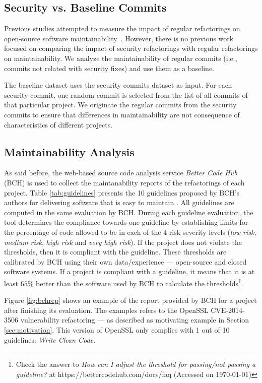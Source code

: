 \documentclass[10pt,conference]{IEEEtran}
\begin{document}
%
\subsection{Security vs. Baseline Commits}
%
Previous studies attempted to measure the impact of regular refactorings on
open-source software maintainability~\cite{HEGEDUS2018313}. However, 
there is no previous work focused on comparing the impact of security 
refactorings with regular refactorings on maintainability. 
We analyze the maintainability of regular commits
(i.e., commits not related with security fixes) and use them as a baseline.

The baseline dataset uses the security commits dataset as input. For each
security commit, one random commit is selected from the list of all commits of
that particular project. We originate the regular commits from the security
commits to ensure that differences in maintainability are not consequence of
characteristics of different projects.
%
\subsection{Maintainability Analysis}

As said before, the web-based source code analysis service \emph{Better Code
Hub} (BCH) is used to collect the maintanability reports of the refactorings of
each project. Table \ref{tab:guidelines} presents the 10 guidelines
proposed by BCH's authors for delivering software that is easy to maintain
\cite{Visser:2016:OREILLY}. All guidelines are computed in the same evaluation by 
BCH. During each guideline evaluation, the tool determines the compliance towards 
one guideline by establishing limits for the percentage of code allowed to be in 
each of the $4$ risk severity levels (\emph{low risk}, \emph{medium risk}, \emph{high risk} 
and \emph{very high risk}). If the project does not violate the thresholds, then it
is compliant with the guideline. These thresholds are calibrated by BCH using
their own data/experience --- open-source and closed software systems. If a
project is compliant with a guideline, it means that it is at least $65\%$
better than the software used by BCH to calculate the thresholds\footnote{Check
the answer to \emph{How can I adjust the threshold for passing/not passing a
guideline?} at https://bettercodehub.com/docs/faq (Accessed on \today{})}.

Figure \ref{fig:bchrep} shows an example of the report
provided by BCH for a project after finishing its evaluation. The examples
refers to the OpenSSL CVE-2014-3506 vulnerability refactoring ---
as described as motivating example in Section \ref{sec:motivation}. This
version of OpenSSL only complies with 1 out of 10 guidelines: \emph{Write
Clean Code}.
\end{document}

